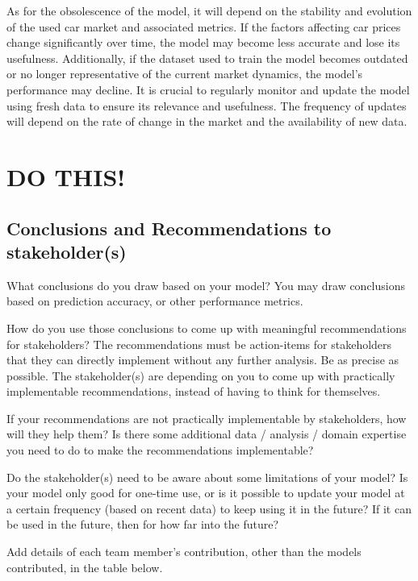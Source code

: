 \documentclass[
  letterpaper,
  DIV=11,
  numbers=noendperiod]{scrartcl}
\begin{document}
As for the obsolescence of the model, it will depend on the stability
and evolution of the used car market and associated metrics. If the
factors affecting car prices change significantly over time, the model
may become less accurate and lose its usefulness. Additionally, if the
dataset used to train the model becomes outdated or no longer
representative of the current market dynamics, the model's performance
may decline. It is crucial to regularly monitor and update the model
using fresh data to ensure its relevance and usefulness. The frequency
of updates will depend on the rate of change in the market and the
availability of new data.

\hypertarget{do-this}{%
\section{DO THIS!}\label{do-this}}

\hypertarget{conclusions-and-recommendations-to-stakeholders}{%
\subsection{Conclusions and Recommendations to
stakeholder(s)}\label{conclusions-and-recommendations-to-stakeholders}}

What conclusions do you draw based on your model? You may draw
conclusions based on prediction accuracy, or other performance metrics.

How do you use those conclusions to come up with meaningful
recommendations for stakeholders? The recommendations must be
action-items for stakeholders that they can directly implement without
any further analysis. Be as precise as possible. The stakeholder(s) are
depending on you to come up with practically implementable
recommendations, instead of having to think for themselves.

If your recommendations are not practically implementable by
stakeholders, how will they help them? Is there some additional data /
analysis / domain expertise you need to do to make the recommendations
implementable?

Do the stakeholder(s) need to be aware about some limitations of your
model? Is your model only good for one-time use, or is it possible to
update your model at a certain frequency (based on recent data) to keep
using it in the future? If it can be used in the future, then for how
far into the future?

Add details of each team member's contribution, other than the models
contributed, in the table below.
\end{document}
